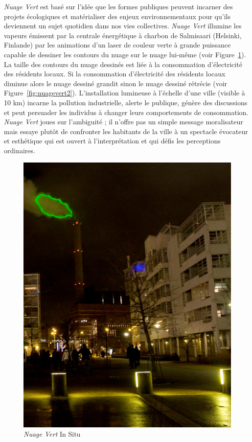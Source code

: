 \documentclass[10pt,a5paper,twoside]{article}
\begin{document}
\emph{Nuage Vert} est basé sur l'idée que les formes publiques peuvent
incarner des projets écologiques et matérialiser des enjeux
environnementaux pour qu'ils deviennent un sujet quotidien dans nos vies
collectives. \emph{Nuage Vert} illumine les vapeurs émissent par la
centrale énergétique à charbon de Salmisaari (Helsinki, Finlande) par
les animations d'un laser de couleur verte à grande puissance capable de
dessiner les contours du nuage sur le nuage lui-même (voir
Figure~\ref{fig:nuagevert1}). La taille des contours du nuage dessinés
est liée à la consommation d'électricité des résidents locaux. Si la
consommation d'électricité des résidents locaux diminue alors le nuage
dessiné grandit sinon le nuage dessiné rétrécie (voir
Figure~\ref{fig:nuagevert2}). L'installation lumineuse à l'échelle d'une
ville (visible à 10 km) incarne la pollution industrielle, alerte le
publique, génère des discussions et peut persuader les individus à
changer leurs comportements de consommation. \emph{Nuage Vert} joues sur
l'ambiguité ; il n'offre pas un simple message moralisateur mais essaye
plutôt de confronter les habitants de la ville à un spectacle évocateur
et esthétique qui est ouvert à l'interprétation et qui défis les
perceptions ordinaires.

\begin{figure}
\centering
\includegraphics[]{images/nuagevert-screenshot1.png}
\caption{\emph{Nuage Vert} In Situ}\label{fig:nuagevert1}
\end{figure}
\end{document}

